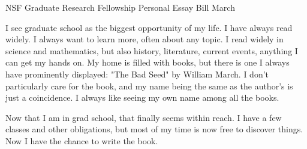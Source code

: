 \documentclass[twoside,leqno, 12pt]{article}
\date{}
\begin{document}
\begin{center}
\LARGE{NSF Graduate Research Fellowship Personal Essay} \newline
\Large{Bill March}
\end{center}



%

%	




I see graduate school as the biggest opportunity of my life.  I have always read widely.  I always want to learn more, often about any topic.  I read widely in science and mathematics, but also history, literature, current events, anything I can get my hands on.  My home is filled with books, but there is one I always have prominently displayed: "The Bad Seed" by William March.  I don't particularly care for the book, and my name being the same as the author's is just a coincidence.  I always like seeing my own name among all the books.

Now that I am in grad school, that finally seems within reach.  I have a few classes and other obligations, but most of my time is now free to discover things.  Now I have the chance to write the book.  
\end{document}
